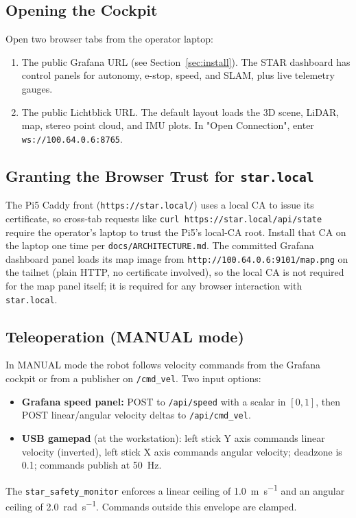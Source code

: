 \documentclass[11pt,letterpaper]{article}
\begin{document}
\subsection{Opening the Cockpit}
Open two browser tabs from the operator laptop:
\begin{enumerate}[leftmargin=1.4em,itemsep=2pt]
\item The public Grafana URL (see
      Section~\ref{sec:install}). The STAR dashboard has control
      panels for autonomy, e-stop, speed, and SLAM, plus live
      telemetry gauges.
\item The public Lichtblick URL. The default layout loads the
      3D scene, LiDAR, map, stereo point cloud, and IMU plots.
      In "Open Connection", enter \texttt{ws://100.64.0.6:8765}.
\end{enumerate}

\subsection{Granting the Browser Trust for \texttt{star.local}}
The Pi5 Caddy front (\texttt{https://star.local/}) uses a local CA
to issue its certificate, so cross-tab requests like
\texttt{curl https://star.local/api/state} require the operator's
laptop to trust the Pi5's local-CA root. Install that CA on the
laptop one time per \texttt{docs/ARCHITECTURE.md}. The committed
Grafana dashboard panel loads its map image from
\texttt{http://100.64.0.6:9101/map.png} on the tailnet (plain HTTP,
no certificate involved), so the local CA is not required for the
map panel itself; it is required for any browser interaction with
\texttt{star.local}.

\subsection{Teleoperation (MANUAL mode)}
In MANUAL mode the robot follows velocity commands from the Grafana
cockpit or from a publisher on \texttt{/cmd\_vel}. Two input options:
\begin{itemize}[leftmargin=1.4em,itemsep=2pt]
\item \textbf{Grafana speed panel:} POST to
      \texttt{/api/speed} with a scalar in $[0, 1]$, then POST
      linear/angular velocity deltas to \texttt{/api/cmd\_vel}.
\item \textbf{USB gamepad} (at the workstation): left stick Y axis
      commands linear velocity (inverted), left stick X axis
      commands angular velocity; deadzone is 0.1; commands publish
      at \qty{50}{\hertz}.
\end{itemize}
The \texttt{star\_safety\_monitor} enforces a linear ceiling of
\qty{1.0}{\meter\per\second} and an angular ceiling of
\qty{2.0}{\radian\per\second}. Commands outside this envelope are
clamped.
\end{document}
